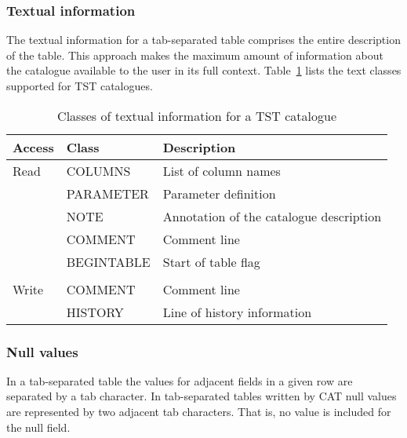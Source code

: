 \subsubsection{Textual information}

The textual information for a tab-separated table comprises the entire
description of the table.  This approach makes the maximum amount of
information about the catalogue available to the user in its full context.
Table~\ref{TST_TEXT} lists the text classes supported for TST catalogues.

\begin{table}[htbp]

\begin{center}
\begin{tabular}{lll}
Access & Class        & Description   \\ \hline
Read   & COLUMNS      & List of column names \\
       & PARAMETER    & Parameter definition \\
       & NOTE         & Annotation of the catalogue description \\
       & COMMENT      & Comment line  \\
       & BEGINTABLE   & Start of table flag \\
       &              & \\
Write  & COMMENT      & Comment line  \\
       & HISTORY      & Line of history information \\
\end{tabular}
\end{center}

\caption{\label{TST_TEXT}Classes of textual information for a TST
catalogue}

\end{table}

\subsubsection{Null values}

In a tab-separated table the values for adjacent fields in a given row are
separated by a tab character.  In tab-separated tables written by CAT
null values are represented by two adjacent tab characters.  That is, no
value is included for the null field.




